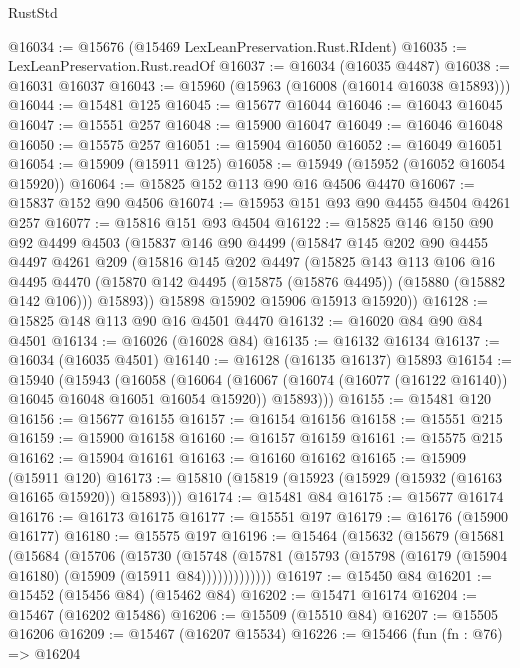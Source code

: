 \begin{lexlean}{RustStd}
\begin{coremodule}
@16034 := @15676 (@15469 LexLeanPreservation.Rust.RIdent)
@16035 := LexLeanPreservation.Rust.readOf
@16037 := @16034 (@16035 @4487)
@16038 := @16031 @16037
@16043 := @15960 (@15963 (@16008 (@16014 @16038 @15893)))
@16044 := @15481 @125
@16045 := @15677 @16044
@16046 := @16043 @16045
@16047 := @15551 @257
@16048 := @15900 @16047
@16049 := @16046 @16048
@16050 := @15575 @257
@16051 := @15904 @16050
@16052 := @16049 @16051
@16054 := @15909 (@15911 @125)
@16058 := @15949 (@15952 (@16052 @16054 @15920))
@16064 := @15825 @152 @113 @90 @16 @4506 @4470
@16067 := @15837 @152 @90 @4506
@16074 := @15953 @151 @93 @90 @4455 @4504 @4261 @257
@16077 := @15816 @151 @93 @4504
@16122 := @15825
    @146
    @150
    @90
    @92
    @4499
    @4503
    (@15837
      @146
      @90
      @4499
      (@15847
        @145
        @202
        @90
        @4455
        @4497
        @4261
        @209
        (@15816
          @145
          @202
          @4497
          (@15825
            @143
            @113
            @106
            @16
            @4495
            @4470
            (@15870 @142 @4495 (@15875 (@15876 @4495)) (@15880 (@15882 @142 @106)))
            @15893))
        @15898
        @15902
        @15906
        @15913
        @15920))
@16128 := @15825 @148 @113 @90 @16 @4501 @4470
@16132 := @16020 @84 @90 @84 @4501
@16134 := @16026 (@16028 @84)
@16135 := @16132 @16134
@16137 := @16034 (@16035 @4501)
@16140 := @16128 (@16135 @16137) @15893
@16154 := @15940
    (@15943
      (@16058
        (@16064
          (@16067 (@16074 (@16077 (@16122 @16140)) @16045 @16048 @16051 @16054 @15920))
          @15893)))
@16155 := @15481 @120
@16156 := @15677 @16155
@16157 := @16154 @16156
@16158 := @15551 @215
@16159 := @15900 @16158
@16160 := @16157 @16159
@16161 := @15575 @215
@16162 := @15904 @16161
@16163 := @16160 @16162
@16165 := @15909 (@15911 @120)
@16173 := @15810 (@15819 (@15923 (@15929 (@15932 (@16163 @16165 @15920)) @15893)))
@16174 := @15481 @84
@16175 := @15677 @16174
@16176 := @16173 @16175
@16177 := @15551 @197
@16179 := @16176 (@15900 @16177)
@16180 := @15575 @197
@16196 := @15464
    (@15632
      (@15679
        (@15681
          (@15684
            (@15706
              (@15730
                (@15748
                  (@15781 (@15793 (@15798 (@16179 (@15904 @16180) (@15909 (@15911 @84)))))))))))))
@16197 := @15450 @84
@16201 := @15452 (@15456 @84) (@15462 @84)
@16202 := @15471 @16174
@16204 := @15467 (@16202 @15486)
@16206 := @15509 (@15510 @84)
@16207 := @15505 @16206
@16209 := @15467 (@16207 @15534)
@16226 := @15466
    (fun (fn : @76) =>
    @16204

\end{coremodule}
\end{lexlean}
